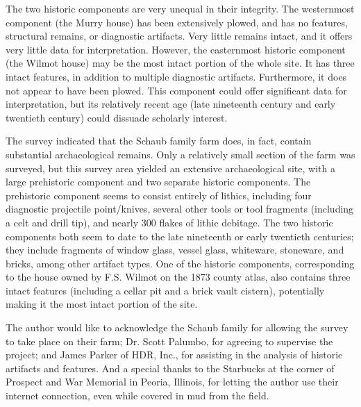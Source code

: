 The two historic components are very unequal in their integrity. The westernmost component (the Murry house) has been extensively plowed, and has no features, structural remains, or diagnostic artifacts. Very little remains intact, and it offers very little data for interpretation. However, the easternmost historic component (the Wilmot house) may be the most intact portion of the whole site. It has three intact features, in addition to multiple diagnostic artifacts. Furthermore, it does not appear to have been plowed. This component could offer significant data for interpretation, but its relatively recent age (late nineteenth century and early twentieth century) could dissuade scholarly interest.


The survey indicated that the Schaub family farm does, in fact, contain substantial archaeological remains. Only a relatively small section of the farm was surveyed, but this survey area yielded an extensive archaeological site, with a large prehistoric component and two separate historic components. The prehistoric component seems to consist entirely of lithics, including four diagnostic projectile point/knives, several other tools or tool fragments (including a celt and drill tip), and nearly 300 flakes of lithic debitage. The two historic components both seem to date to the late nineteenth or early twentieth centuries; they include fragments of window glass, vessel glass, whiteware, stoneware, and bricks, among other artifact types. One of the historic components, corresponding to the house owned by F.S. Wilmot on the 1873 county atlas, also contains three intact features (including a cellar pit and a brick vault cistern), potentially making it the most intact portion of the site.

\IJSRAseparator


The author would like to acknowledge the Schaub family for allowing the survey to take place on their farm; Dr. Scott Palumbo, for agreeing to supervise the project; and James Parker of HDR, Inc., for assisting in the analysis of historic artifacts and features. And a special thanks to the Starbucks at the corner of Prospect and War Memorial in Peoria, Illinois, for letting the author use their internet connection, even while covered in mud from the field.


\IJSRAseparator

